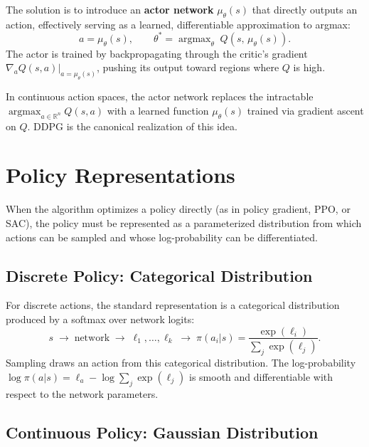 The solution is to introduce an \textbf{actor network} $\mu_\theta(s)$ that
directly outputs an action, effectively serving as a learned, differentiable
approximation to argmax:
\begin{equation}
  a = \mu_\theta(s), \qquad
  \theta^{\ast} = \operatorname{argmax}_\theta\; Q(s,\, \mu_\theta(s)).
\end{equation}
The actor is trained by backpropagating through the critic's gradient
$\nabla_a Q(s,a)\big|_{a=\mu_\theta(s)}$, pushing its output toward regions
where $Q$ is high.

\begin{keyidea}
In continuous action spaces, the actor network replaces the intractable
$\operatorname{argmax}_{a \in \mathbb{R}^n} Q(s,a)$ with a learned function
$\mu_\theta(s)$ trained via gradient ascent on $Q$.  DDPG is the canonical
realization of this idea.
\end{keyidea}


\section{Policy Representations}
\label{sec:policy-representations}

When the algorithm optimizes a policy directly (as in policy gradient, PPO, or
SAC), the policy must be represented as a parameterized distribution from which
actions can be sampled and whose log-probability can be differentiated.

\subsection{Discrete Policy: Categorical Distribution}

For discrete actions, the standard representation is a categorical distribution
produced by a softmax over network logits:
\begin{equation}
  s \;\longrightarrow\; \text{network} \;\longrightarrow\;
  \ell_1, \ldots, \ell_k
  \;\longrightarrow\;
  \pi(a_i|s) = \frac{\exp(\ell_i)}{\sum_j \exp(\ell_j)}.
\end{equation}
Sampling draws an action from this categorical distribution.  The log-probability
$\log \pi(a|s) = \ell_a - \log\sum_j \exp(\ell_j)$ is smooth and differentiable
with respect to the network parameters.

\subsection{Continuous Policy: Gaussian Distribution}

